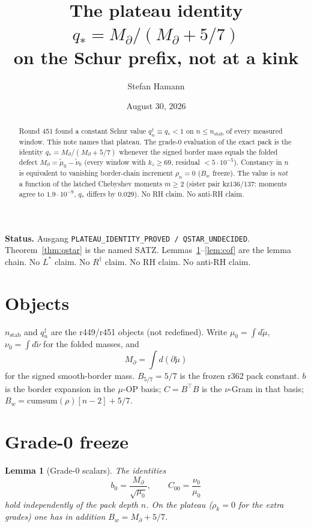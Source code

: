 \documentclass[11pt]{article}
\title{\bfseries The plateau identity\\[2mm]
\large $q_*=M_\partial/(M_\partial+5/7)$\\
on the Schur prefix, not at a kink}
\author{Stefan Hamann}
\date{August 30, 2026}
\newtheorem{lemma}{Lemma}
\begin{document}
\maketitle

\begin{abstract}\noindent
Round 451 found a constant Schur value
$q^{\dagger}_n\equiv q_*<1$ on
$n\le n_{\mathrm{stab}}$ of every measured
window.
This note names that plateau.
The grade-0 evaluation of the exact pack is
the identity
$q_*=M_\partial/(M_\partial+5/7)$
whenever the signed border mass equals the
folded defect $M_\partial=\tilde\mu_0-\tilde\nu_0$
(every window with $k_z\ge 69$, residual
$<5\cdot10^{-5}$).
Constancy in $n$ is equivalent to vanishing
border-chain increment $\rho_n=0$
($B_w$ freeze).
The value is \emph{not} a function of the
latched Chebyshev moments $m\ge 2$
(sister pair kz$136/137$: moments agree to
$1.9\cdot10^{-9}$, $q_*$ differs by $0.029$).
No RH claim.  No anti-RH claim.
\end{abstract}

\medskip\noindent
\textbf{Status.}\enspace
Ausgang
\texttt{PLATEAU\_IDENTITY\_PROVED / QSTAR\_UNDECIDED}.
Theorem~\ref{thm:qstar} is the named SATZ.
Lemmas~\ref{lem:g0}--\ref{lem:cof} are the
lemma chain.
No $L^{*}$ claim.  No $R^{\dagger}$ claim.
No RH claim.  No anti-RH claim.

\section{Objects}\label{sec:obj}

$n_{\mathrm{stab}}$ and $q^{\dagger}_n$ are the
r449/r451 objects (not redefined).
Write $\mu_0=\int d\tilde\mu$,
$\nu_0=\int d\tilde\nu$ for the folded
masses, and
\[
M_\partial
=\int d(\partial\tilde\mu)
\]
for the signed smooth-border mass.
$B_{5/7}=5/7$ is the frozen r362 pack
constant.
$b$ is the border expansion in the
$\mu$-OP basis; $C=B^\top B$ is the
$\nu$-Gram in that basis;
$B_w=\mathrm{cumsum}(\rho)[n-2]+5/7$.

\section{Grade-0 freeze}\label{sec:g0}

\begin{lemma}[Grade-0 scalars]\label{lem:g0}
The identities
\[
b_0=\frac{M_\partial}{\sqrt{\mu_0}},
\qquad
C_{00}=\frac{\nu_0}{\mu_0}
\]
hold independently of the pack depth $n$.
On the plateau ($\rho_k=0$ for the extra
grades) one has in addition
$B_w=M_\partial+5/7$.
\end{lemma}
\end{document}
